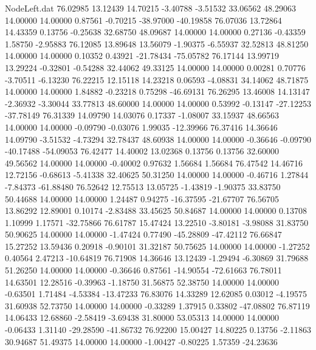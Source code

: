 \begin{filecontents}{NodeLeft.dat}
  76.02985   13.12439   14.70215    -3.40788   -3.51532   33.06562   48.29063   14.00000   14.00000    0.87561   -0.70215  -38.97000  -40.19858
  76.07036   13.72864   14.43359     0.13756   -0.25638   32.68750   48.09687   14.00000   14.00000    0.27136   -0.43359    1.58750   -2.95883
  76.12085   13.89648   13.56079    -1.90375   -6.55937   32.52813   48.81250   14.00000   14.00000    0.10352    0.43921  -21.78434  -75.05782
  76.17144   13.99719   13.29224    -0.32801   -0.54288   32.44062   49.33125   14.00000   14.00000    0.00281    0.70776   -3.70511   -6.13230
  76.22215   12.15118   14.23218     0.06593   -4.08831   34.14062   48.71875   14.00000   14.00000    1.84882   -0.23218    0.75298  -46.69131
  76.26295   13.46008   14.13147    -2.36932   -3.30044   33.77813   48.60000   14.00000   14.00000    0.53992   -0.13147  -27.12253  -37.78149
  76.31339   14.09790   14.03076     0.17337   -1.08007   33.15937   48.66563   14.00000   14.00000   -0.09790   -0.03076    1.99035  -12.39966
  76.37416   14.36646   14.09790    -3.51532   -4.73294   32.78437   48.60938   14.00000   14.00000   -0.36646   -0.09790  -40.17488  -54.09053
  76.42477   14.40002   13.02368     0.13756    0.13756   32.60000   49.56562   14.00000   14.00000   -0.40002    0.97632    1.56684    1.56684
  76.47542   14.46716   12.72156    -0.68613   -5.41338   32.40625   50.31250   14.00000   14.00000   -0.46716    1.27844   -7.84373  -61.88480
  76.52642   12.75513   13.05725    -1.43819   -1.90375   33.83750   50.44688   14.00000   14.00000    1.24487    0.94275  -16.37595  -21.67707
  76.56705   13.86292   12.89001     0.10174   -2.83488   33.45625   50.84687   14.00000   14.00000    0.13708    1.10999    1.17571  -32.75866
  76.61787   15.47424   13.22510    -3.80181   -3.98088   31.83750   50.90625   14.00000   14.00000   -1.47424    0.77490  -45.28809  -47.42112
  76.66847   15.27252   13.59436     0.20918   -0.90101   31.32187   50.75625   14.00000   14.00000   -1.27252    0.40564    2.47213  -10.64819
  76.71908   14.36646   13.12439    -1.29494   -6.30869   31.79688   51.26250   14.00000   14.00000   -0.36646    0.87561  -14.90554  -72.61663
  76.78011   14.63501   12.28516    -0.39963   -1.18750   31.56875   52.38750   14.00000   14.00000   -0.63501    1.71484   -4.53384  -13.47233
  76.83076   14.33289   12.62085     0.03012   -4.19575   31.60938   52.73750   14.00000   14.00000   -0.33289    1.37915    0.33802  -47.08802
  76.87119   14.06433   12.68860    -2.58419   -3.69438   31.80000   53.05313   14.00000   14.00000   -0.06433    1.31140  -29.28590  -41.86732
  76.92200   15.00427   14.80225     0.13756   -2.11863   30.94687   51.49375   14.00000   14.00000   -1.00427   -0.80225    1.57359  -24.23636

\end{filecontents}
